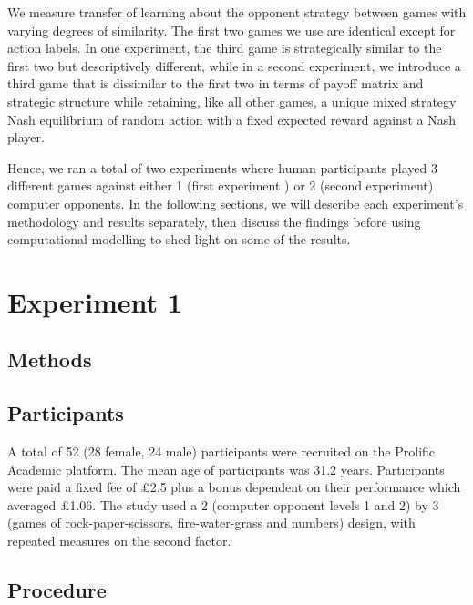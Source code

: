 \documentclass[man,floatsintext]{apa6}
\begin{document}
We measure transfer of learning about the opponent strategy between games with varying degrees of similarity. The first two games we use are identical except for action labels. In one experiment, the third game is strategically similar to the first two but descriptively different, while in a second experiment, we introduce a third game that is dissimilar to the first two in terms of payoff matrix and strategic structure while retaining, like all other games, a unique mixed strategy Nash equilibrium of random action with a fixed expected reward against a Nash player.

Hence, we ran a total of two experiments where human participants played 3 different games against either 1 (first experiment ) or 2 (second experiment) computer opponents. In the following sections, we will describe each experiment's methodology and results separately, then discuss the findings before using computational modelling to shed light on some of the results.

\newpage

\hypertarget{experiment-1}{%
\section{Experiment 1}\label{experiment-1}}

\hypertarget{methods}{%
\subsection{Methods}\label{methods}}

\hypertarget{participants}{%
\subsection{Participants}\label{participants}}

A total of 52 (28 female, 24 male) participants were recruited on the Prolific Academic platform. The mean age of participants was 31.2 years. Participants were paid a fixed fee of £2.5 plus a bonus dependent on their performance which averaged £1.06. The study used a 2 (computer opponent levels 1 and 2) by 3 (games of rock-paper-scissors, fire-water-grass and numbers) design, with repeated measures on the second factor.

\hypertarget{procedure}{%
\subsection{Procedure}\label{procedure}}
\end{document}
